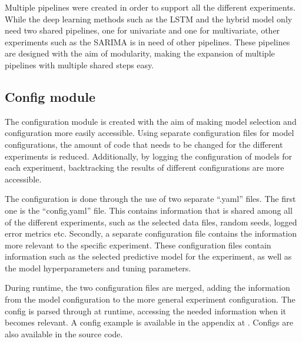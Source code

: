 

Multiple pipelines were created in order to support all the different experiments.
While the deep learning methods such as the LSTM and the hybrid model only need two shared pipelines,
one for univariate and one for multivariate,
other experiments such as the SARIMA is in need of other pipelines.
These pipelines are designed with the aim of modularity,
making the expansion of multiple pipelines with multiple shared steps easy.




\subsection{Config module}
The configuration module is created with the aim of making model selection and configuration more easily accessible.
Using separate configuration files for model configurations,
the amount of code that needs to be changed for the different experiments is reduced.
Additionally, by logging the configuration of models for each experiment,
backtracking the results of different configurations are more accessible.

The configuration is done through the use of two separate ``.yaml'' files.
The first one is the ``config.yaml'' file.
This contains information that is shared among all of the different experiments,
such as the selected data files, random seeds, logged error metrics etc.
Secondly, a separate configuration file contains the information more relevant to the specific experiment.
These configuration files contain information such as
the selected predictive model for the experiment,
as well as the model hyperparameters and tuning parameters.

During runtime, the two configuration files are merged, adding the information from the model configuration to the more general experiment configuration.
The config is parsed through at runtime, accessing the needed information when it becomes relevant.
A config example is available in the appendix at .
Configs are also available in the source code.




